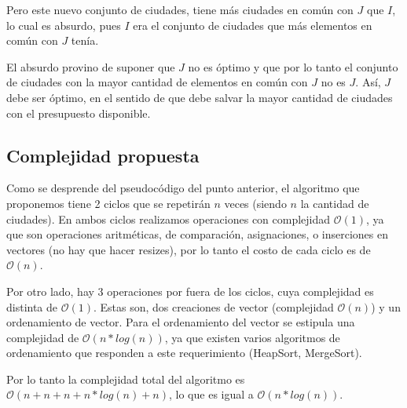 Pero este nuevo conjunto de ciudades, tiene más ciudades en común con $J$ que $I$, lo cual es absurdo, pues $I$ era el conjunto de ciudades que más elementos en común con $J$ tenía.

El absurdo provino de suponer que $J$ no es óptimo y que por lo tanto el conjunto de ciudades con la mayor cantidad de elementos en común con $J$ no es $J$. Así, $J$ debe ser óptimo, en el sentido de que debe salvar la mayor cantidad de ciudades con el presupuesto disponible.


\subsection{Complejidad propuesta}

Como se desprende del pseudocódigo del punto anterior, el algoritmo que proponemos tiene 2 ciclos que se repetirán $n$ veces (siendo $n$ la cantidad de ciudades). En ambos ciclos realizamos operaciones con complejidad $\mathcal{O}(1)$, ya que son operaciones aritméticas, de comparación, asignaciones, o inserciones en vectores (no hay que hacer resizes), por lo tanto el costo de cada ciclo es de $\mathcal{O}(n)$.

Por otro lado, hay 3 operaciones por fuera de los ciclos, cuya complejidad es distinta de $\mathcal{O}(1)$. Estas son, dos creaciones de vector (complejidad $\mathcal{O}(n)$) y un ordenamiento de vector. Para el ordenamiento del vector se estipula una complejidad de $\mathcal{O}(n*log(n))$, ya que existen varios algoritmos de ordenamiento que responden a este requerimiento (HeapSort, MergeSort).

Por lo tanto la complejidad total del algoritmo es $\mathcal{O}(n + n + n + n*log(n) + n)$, lo que es igual a $\mathcal{O}(n*log(n))$.

